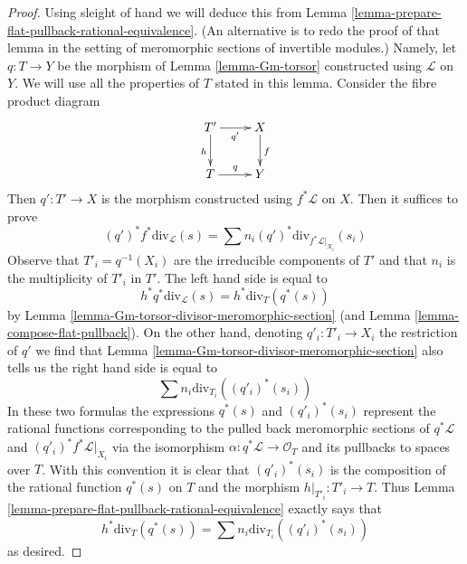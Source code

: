 \documentclass[10pt,a4paper]{amsart}
\theoremstyle{plain}
\theoremstyle{definition}
\theoremstyle{remark}
\numberwithin{equation}{subsection}
\begin{document}
\begin{proof}
Using sleight of hand we will deduce this from
Lemma \ref{lemma-prepare-flat-pullback-rational-equivalence}.
(An alternative is to redo the proof of that lemma in the
setting of meromorphic sections of invertible modules.)
Namely, let $q : T \to Y$ be the morphism of
Lemma \ref{lemma-Gm-torsor} constructed using $\mathcal{L}$ on $Y$.
We will use all the properties of $T$ stated in this lemma.
Consider the fibre product diagram
$$
\xymatrix{
T' \ar[r]_{q'} \ar[d]_h & X \ar[d]^f \\
T \ar[r]^q & Y
}
$$
Then $q' : T' \to X$ is the morphism constructed using $f^*\mathcal{L}$
on $X$. Then it suffices to prove
$$
(q')^*f^*\text{div}_\mathcal{L}(s) =
\sum n_i (q')^*\text{div}_{f^*\mathcal{L}|_{X_i}}(s_i)
$$
Observe that $T'_i = q^{-1}(X_i)$ are the irreducible components of $T'$
and that $n_i$ is the multiplicity of $T'_i$ in $T'$.
The left hand side is equal to
$$
h^*q^*\text{div}_\mathcal{L}(s) = h^*\text{div}_T(q^*(s))
$$
by Lemma \ref{lemma-Gm-torsor-divisor-meromorphic-section}
(and Lemma \ref{lemma-compose-flat-pullback}).
On the other hand, denoting $q'_i : T'_i \to X_i$
the restriction of $q'$ we find that
Lemma \ref{lemma-Gm-torsor-divisor-meromorphic-section}
also tells us the right hand side is equal to
$$
\sum n_i \text{div}_{T_i}((q'_i)^*(s_i))
$$
In these two formulas the expressions $q^*(s)$ and $(q'_i)^*(s_i)$
represent the rational functions corresponding to the pulled back
meromorphic sections of $q^*\mathcal{L}$ and $(q'_i)^*f^*\mathcal{L}|_{X_i}$
via the isomorphism $\alpha : q^*\mathcal{L} \to \mathcal{O}_T$
and its pullbacks to spaces over $T$. With this convention it is
clear that $(q'_i)^*(s_i)$ is the composition of the rational function
$q^*(s)$ on $T$ and the morphism $h|_{T'_i} : T'_i \to T$.
Thus Lemma \ref{lemma-prepare-flat-pullback-rational-equivalence}
exactly says that
$$
h^*\text{div}_T(q^*(s)) = \sum n_i \text{div}_{T_i}((q'_i)^*(s_i))
$$
as desired.
\end{proof}
\end{document}
